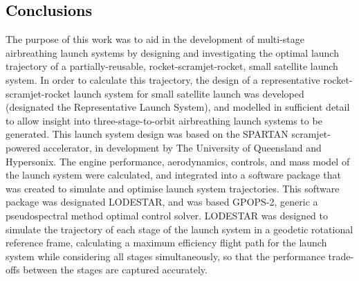 
\cleardoublepage
\textcolor{black}{
\chapter{Conclusions}
}
\noindent
The purpose of this work was to aid in the development of multi-stage airbreathing launch systems by designing and investigating the optimal launch trajectory of a partially-reusable, rocket-scramjet-rocket, small satellite launch system. 
In order to calculate this trajectory, the design of a representative rocket-scramjet-rocket launch system for small satellite launch was developed (designated the Representative Launch System), and modelled in sufficient detail to allow insight into three-stage-to-orbit airbreathing launch systems to be generated. This launch system design was based on the SPARTAN scramjet-powered accelerator, in development by The University of Queensland and Hypersonix. The engine performance, aerodynamics, controls, and mass model of the launch system were calculated, and integrated into a software package that was created to simulate and optimise launch system trajectories. This software package was designated LODESTAR, and was based GPOPS-2, generic a pseudospectral method optimal control solver. LODESTAR was designed to simulate the trajectory of each stage of the launch system in a geodetic rotational reference frame, calculating a maximum efficiency flight path for the launch system while considering all stages simultaneously, so that the performance trade-offs between the stages are captured accurately.

